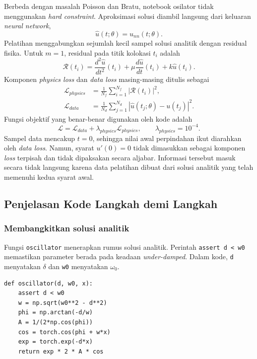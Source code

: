 \documentclass[12pt, letterpaper]{article}
\begin{document}
Berbeda dengan masalah Poisson dan Bratu, notebook osilator tidak menggunakan
\textit{hard constraint}. Aproksimasi solusi diambil langsung dari keluaran
\textit{neural network},
\begin{equation}
    \hat{u}(t;\theta)=u_{nn}(t;\theta).
\end{equation}
Pelatihan menggabungkan sejumlah kecil sampel solusi analitik dengan residual
fisika. Untuk $m=1$, residual pada titik kolokasi $t_i$ adalah
\begin{equation}
    \mathcal{R}(t_i)=
    \frac{d^2\hat{u}}{dt^2}(t_i)
    +\mu\frac{d\hat{u}}{dt}(t_i)
    +k\hat{u}(t_i).
\end{equation}
Komponen \textit{physics loss} dan \textit{data loss} masing-masing ditulis
sebagai
\begin{align}
    \mathcal{L}_{physics}
    &=\frac{1}{N_f}\sum_{i=1}^{N_f}|\mathcal{R}(t_i)|^2,\\
    \mathcal{L}_{data}
    &=\frac{1}{N_d}\sum_{j=1}^{N_d}
      |\hat{u}(t_j;\theta)-u(t_j)|^2.
\end{align}
Fungsi objektif yang benar-benar digunakan oleh kode adalah
\begin{equation}
    \mathcal{L}=\mathcal{L}_{data}
    +\lambda_{physics}\mathcal{L}_{physics},
    \qquad \lambda_{physics}=10^{-4}.
\end{equation}
Sampel data mencakup $t=0$, sehingga nilai awal perpindahan ikut diarahkan oleh
\textit{data loss}. Namun, syarat $u'(0)=0$ tidak dimasukkan sebagai komponen
\textit{loss} terpisah dan tidak dipaksakan secara aljabar. Informasi tersebut
masuk secara tidak langsung karena data pelatihan dibuat dari solusi analitik
yang telah memenuhi kedua syarat awal.

\subsection{Penjelasan Kode Langkah demi Langkah}

\subsubsection{Membangkitkan solusi analitik}

Fungsi \texttt{oscillator} menerapkan rumus solusi analitik. Perintah
\texttt{assert d < w0} memastikan parameter berada pada keadaan
\textit{under-damped}. Dalam kode, \texttt{d} menyatakan $\delta$ dan
\texttt{w0} menyatakan $\omega_0$.

\begin{lstlisting}[caption={Solusi analitik osilator harmonik teredam}]
def oscillator(d, w0, x):
    assert d < w0
    w = np.sqrt(w0**2 - d**2)
    phi = np.arctan(-d/w)
    A = 1/(2*np.cos(phi))
    cos = torch.cos(phi + w*x)
    exp = torch.exp(-d*x)
    return exp * 2 * A * cos
\end{lstlisting}
\end{document}
